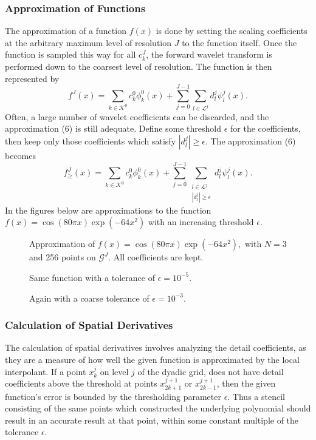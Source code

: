 \documentclass[10.5pt]{article}
\begin{document}
\subsubsection*{Approximation of Functions}
The approximation of a function $f(x)$ is done by setting the scaling coefficients at the arbitrary maximum level of 
resolution $J$ to the function itself. Once the function is sampled this way for all $c_{k}^{J}$, the forward wavelet 
transform is performed down to the coarsest level of resolution. The function is then represented by 
\begin{equation}
        f^J(x)=\sum_{k \in \mathcal{K}^0} c_{k}^{0} \phi_{k}^{0}(x) + \sum_{j=0}^{J-1} \sum_{l \in \mathcal{L}^j}
                d_{l}^{j} \psi_{l}^{j}(x).
\end{equation}
Often, a large number of wavelet coefficients can be discarded, and the approximation (6) is still adequate. Define 
some threshold $\epsilon$ for the coefficients, then keep only those coefficients which satisfy 
$|d_{l}^{j}| \geq \epsilon$. The approximation (6) becomes 
\begin{equation}
        f_{\geq}^{J}(x)=\sum_{k \in \mathcal{K}^0} c_{k}^{0} \phi_{k}^{0}(x) + \sum_{j=0}^{J-1} 
        \sum_{ \substack{ l \in \mathcal{L}^j \\ |d_{l}^{j}| \geq \epsilon} } d_{l}^{j} \psi_{l}^{j}(x).
\end{equation}
In the figures below are approximations to the function $f(x)=\cos{(80 \pi x)} \exp{(-64 x^2)}$ with an increasing threshold 
$\epsilon$.
\begin{figure}
	\center
	
	\caption{Approximation of $f(x)=\cos{(80 \pi x)} \exp{(-64 x^2)},$ with $N=3$ and 256 points on $\mathcal{G}^J$. 
	All coefficients are kept.}
\end{figure}
\begin{figure}
	\center
	
	\caption{Same function with a tolerance of $\epsilon = 10^{-5}$.} 
\end{figure}
\begin{figure}
	\center
	
	\caption{Again with a coarse tolerance of $\epsilon = 10^{-3}$.} 
\end{figure}

\subsubsection*{Calculation of Spatial Derivatives}
The calculation of spatial derivatives involves analyzing the detail coefficients, as they are a measure of how well the 
given function is approximated by the local interpolant. If a point $x_{k}^{j}$ on level $j$ of the dyadic grid, does 
not have detail coefficients above the threshold at points $x_{2k+1}^{j+1}$ or $x_{2k-1}^{j+1}$, then the given 
function's error is bounded by the thresholding parameter $\epsilon$.  Thus a stencil consisting of the same points
which constructed the underlying polynomial should result in an accurate result at that point, 
within some constant multiple of the tolerance $\epsilon$.
\end{document}
